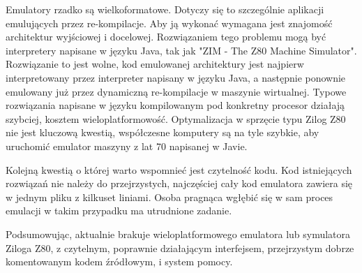 	Emulatory rzadko są wielkoformatowe. Dotyczy się to szczególnie aplikacji emulujących przez re-kompilacje. Aby ją wykonać wymagana jest znajomość architektur wyjściowej i docelowej. Rozwiązaniem tego problemu mogą być interpretery napisane w języku Java, tak jak "ZIM - The Z80 Machine Simulator". Rozwiązanie to jest wolne, kod emulowanej architektury jest najpierw interpretowany przez interpreter napisany w języku Java, a następnie ponownie emulowany już przez dynamiczną re-kompilacje w maszynie wirtualnej. Typowe rozwiązania napisane w języku kompilowanym pod konkretny procesor działają szybciej, kosztem wieloplatformowość. Optymalizacja w sprzęcie typu Zilog Z80 nie jest kluczową kwestią, współczesne komputery są na tyle szybkie, aby uruchomić emulator maszyny z lat 70 napisanej w Javie. 
	
	Kolejną kwestią o której warto wspomnieć jest czytelność kodu. Kod istniejących rozwiązań nie należy do przejrzystych, najczęściej cały kod emulatora zawiera się w jednym pliku z kilkuset liniami. Osoba pragnąca wgłębić się w sam proces emulacji w takim przypadku ma utrudnione zadanie.
	
	Podsumowując, aktualnie brakuje wieloplatformowego emulatora lub symulatora Ziloga Z80, z czytelnym, poprawnie działającym interfejsem, przejrzystym dobrze komentowanym kodem źródłowym, i system pomocy.
	
	